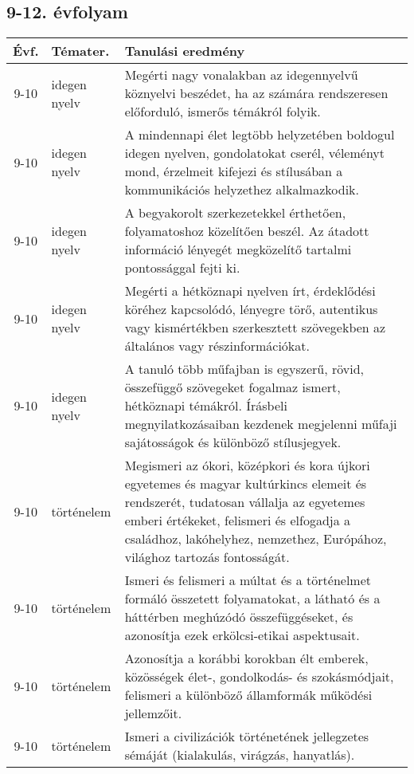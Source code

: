 \subsection{9-12. évfolyam}
\begin{small}
  \begin{longtable}{c | p{2cm} |  p{11cm} }
    \textbf{Évf.} & \textbf{Témater.} & \textbf{Tanulási eredmény} \\ \hline \hline
    \endhead

              9-10 & idegen nyelv & Megérti nagy vonalakban az idegennyelvű köznyelvi beszédet, ha az számára rendszeresen előforduló, ismerős témákról folyik. \\ \hline
              9-10 & idegen nyelv & A mindennapi élet legtöbb helyzetében boldogul idegen nyelven, gondolatokat cserél, véleményt mond, érzelmeit kifejezi és stílusában a kommunikációs helyzethez alkalmazkodik. \\ \hline
              9-10 & idegen nyelv & A begyakorolt szerkezetekkel érthetően, folyamatoshoz közelítően beszél. Az átadott információ lényegét megközelítő tartalmi pontossággal fejti ki. \\ \hline
              9-10 & idegen nyelv & Megérti a hétköznapi nyelven írt, érdeklődési köréhez kapcsolódó, lényegre törő, autentikus vagy kismértékben szerkesztett szövegekben az általános vagy részinformációkat. \\ \hline
              9-10 & idegen nyelv & A tanuló több műfajban is egyszerű, rövid, összefüggő szövegeket fogalmaz ismert, hétköznapi témákról. Írásbeli megnyilatkozásaiban kezdenek megjelenni műfaji sajátosságok és különböző stílusjegyek. \\ \hline
              9-10 & történelem & Megismeri az ókori, középkori és kora újkori egyetemes és magyar kultúrkincs elemeit és rendszerét, tudatosan vállalja az egyetemes emberi értékeket, felismeri és elfogadja a családhoz, lakóhelyhez, nemzethez, Európához, világhoz tartozás fontosságát. \\ \hline
              9-10 & történelem & Ismeri és felismeri a múltat és a történelmet formáló összetett folyamatokat, a látható és a háttérben meghúzódó összefüggéseket, és azonosítja ezek erkölcsi-etikai aspektusait. \\ \hline
              9-10 & történelem & Azonosítja a korábbi korokban élt emberek, közösségek élet-, gondolkodás- és szokásmódjait, felismeri a különböző államformák működési jellemzőit. \\ \hline
              9-10 & történelem & Ismeri a civilizációk történetének jellegzetes sémáját (kialakulás, virágzás, hanyatlás). \\ \hline

\end{longtable}
\end{small}
